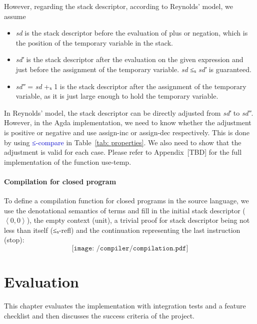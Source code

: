 \documentclass[12pt,a4paper]{report}
\theoremstyle{definition}
\newcommand{\mb}[1]{\textcolor{mediumblue}{#1}}
\newcommand{\mbt}[1]{\mb{\textsf{#1}}}
\newcommand{\ang}[1]{\left\langle #1 \right\rangle}
\begin{document}
        However, regarding the stack descriptor, according to Reynolds' model, we assume
        \begin{itemize}
            \item \textit{sd} is the stack descriptor before the evaluation of plus or negation, which is the position of the temporary variable in the stack.
            \item \textit{sd′} is the stack descriptor after the evaluation on the given expression and just before the assignment of the temporary variable. \textit{sd} ≤ₛ \textit{sd′} is guaranteed.
            \item \textit{sd″} = \textit{sd} +ₛ 1 is the stack descriptor after the assignment of the temporary variable, as it is just large enough to hold the temporary variable.
        \end{itemize}
        In Reynolds' model, the stack descriptor can be directly adjusted from \textit{sd′} to \textit{sd″}. However, in the Agda implementation, we need to know whether the adjustment is positive or negative and use \textsf{assign-inc} or \textsf{assign-dec} respectively. This is done by using \mbt{≤-compare} in Table~\ref{tab: properties}. We also need to show that the adjustment is valid for each case. Please refer to Appendix~[TBD] for the full implementation of the function \textsf{use-temp}.
        

        \subsubsection{Compilation for closed program} \label{subsubsec: compilation}
        To define a compilation function for closed programs in the source language, we use the denotational semantics of terms and fill in the initial stack descriptor ($\ang{0, 0}$), the empty context (\textsf{unit}), a trivial proof for stack descriptor being not less than itself (\textsf{≤ₛ-refl}) and the continuation representing the last instruction (\textsf{stop}):
        \[\texttt{[image: /compiler/compilation.pdf]}\]




\chapter{Evaluation}
    \minitoc
    This chapter evaluates the implementation with integration tests and a feature checklist and then discusses the success criteria of the project.
\end{document}
